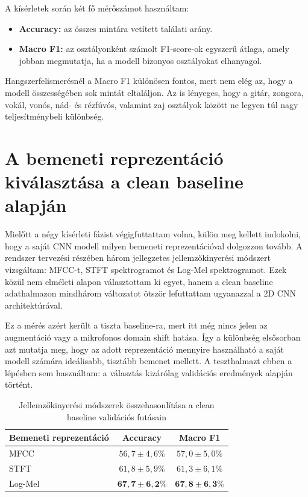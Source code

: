 A kísérletek során két fő mérőszámot használtam:
\begin{itemize}
    \item \textbf{Accuracy:} az összes mintára vetített találati arány.
    \item \textbf{Macro F1:} az osztályonként számolt F1-score-ok egyszerű átlaga, amely jobban megmutatja, ha a modell bizonyos osztályokat elhanyagol.
\end{itemize}

Hangszerfelismerésnél a Macro F1 különösen fontos, mert nem elég az, hogy a modell összességében sok mintát eltaláljon. Az is lényeges, hogy a gitár, zongora, vokál, vonós, nád- és rézfúvós, valamint zaj osztályok között ne legyen túl nagy teljesítménybeli különbség.

\section{A bemeneti reprezentáció kiválasztása a clean baseline alapján}
\label{sec:feature_valasztas}

Mielőtt a négy kísérleti fázist végigfuttattam volna, külön meg kellett indokolni, hogy a saját CNN modell milyen bemeneti reprezentációval dolgozzon tovább. A rendszer tervezési részében három jellegzetes jellemzőkinyerési módszert vizsgáltam: MFCC-t, STFT spektrogramot és Log-Mel spektrogramot. Ezek közül nem elméleti alapon választottam ki egyet, hanem a clean baseline adathalmazon mindhárom változatot ötször lefuttattam ugyanazzal a 2D CNN architektúrával.

Ez a mérés azért került a tiszta baseline-ra, mert itt még nincs jelen az augmentáció vagy a mikrofonos domain shift hatása. Így a különbség elsősorban azt mutatja meg, hogy az adott reprezentáció mennyire használható a saját modell számára ideálisabb, tisztább bemenet mellett. A teszthalmazt ebben a lépésben sem használtam: a választás kizárólag validációs eredmények alapján történt.

\begin{table}[H]
\centering
\caption{Jellemzőkinyerési módszerek összehasonlítása a clean baseline validációs futásain}
\label{tab:feature_selection_clean}
\begin{tabular}{lcc}
\toprule
\textbf{Bemeneti reprezentáció} & \textbf{Accuracy} & \textbf{Macro F1} \\
\midrule
MFCC & \(56{,}7 \pm 4{,}6\%\) & \(57{,}0 \pm 5{,}0\%\) \\
STFT & \(61{,}8 \pm 5{,}9\%\) & \(61{,}3 \pm 6{,}1\%\) \\
Log-Mel & \(\mathbf{67{,}7 \pm 6{,}2\%}\) & \(\mathbf{67{,}8 \pm 6{,}3\%}\) \\
\bottomrule
\end{tabular}
\end{table}

